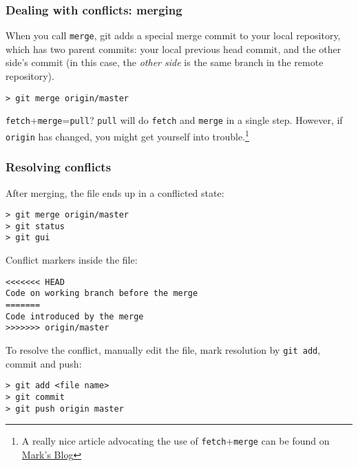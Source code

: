 
\begin{frame}[fragile]
	\frametitle{Dealing with conflicts: merging}
	
	When you call \texttt{merge}, git adds a special merge commit to your local repository, which has two parent commits: your local previous head commit, and the other side's commit (in this case, the \textit{other side} is the same branch in the remote repository).
	\begin{verbatim}
> git merge origin/master
	\end{verbatim}
	
	\begin{block}{\texttt{fetch}+\texttt{merge}=\texttt{pull}?}
	\texttt{pull} will do \texttt{fetch} and \texttt{merge} in a single step. However, if \texttt{origin} has changed, you might get yourself into trouble.\footnote{A really nice article advocating the use of \texttt{fetch}+\texttt{merge} can be found on \href{http://longair.net/blog/2009/04/16/git-fetch-and-merge/}{Mark's Blog}} 
	\end{block}
	
\end{frame}

\begin{frame}[fragile]
	\frametitle{Resolving conflicts}
	
	After merging, the file ends up in a conflicted state:
	\begin{verbatim}
> git merge origin/master
> git status
> git gui
	\end{verbatim}	
	
	Conflict markers inside the file:
	\begin{verbatim}
<<<<<<< HEAD
Code on working branch before the merge
=======
Code introduced by the merge
>>>>>>> origin/master
	\end{verbatim}

	To resolve the conflict, manually edit the file, mark resolution by \texttt{git add}, commit and push:
	\begin{verbatim}
> git add <file name>
> git commit
> git push origin master
	\end{verbatim}
	
\end{frame}


